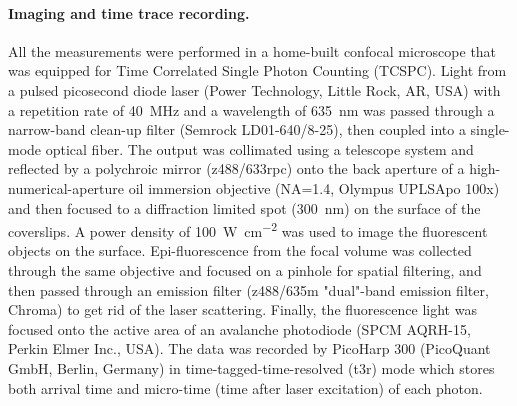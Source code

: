 \paragraph*{Imaging and time trace recording.} All the measurements were performed in a home-built confocal microscope that was equipped for Time Correlated Single Photon Counting (TCSPC).
Light from a pulsed picosecond diode laser (Power Technology, Little Rock, AR, USA) with a repetition rate of \SI{40}{\MHz} and a wavelength of \SI{635}{\nm} was passed through a narrow-band clean-up filter (Semrock LD01-640/8-25), then coupled into a single-mode optical fiber.
The output was collimated using a telescope system and reflected by a polychroic mirror (z488/633rpc) onto the back aperture of a high-numerical-aperture oil immersion objective (NA=1.4, Olympus UPLSApo 100x) and then focused to a diffraction limited spot (\SI{300}{\nm}) on the surface of the coverslips.
A power density of \SI[per-mode=repeated-symbol]{100}{\watt\per\cm\squared} was used to image the fluorescent objects on the surface.
Epi-fluorescence from the focal volume was collected through the same objective and focused on a pinhole for spatial filtering, and then passed through an emission filter (z488/635m "dual"-band emission filter, Chroma) to get rid of the laser scattering.
Finally, the fluorescence light was focused onto the active area of an avalanche photodiode (SPCM AQRH-15, Perkin Elmer Inc., USA).
The data was recorded by PicoHarp 300 (PicoQuant GmbH, Berlin, Germany) in time-tagged-time-resolved (t3r) mode which stores both arrival time and micro-time (time after laser excitation) of each photon.


